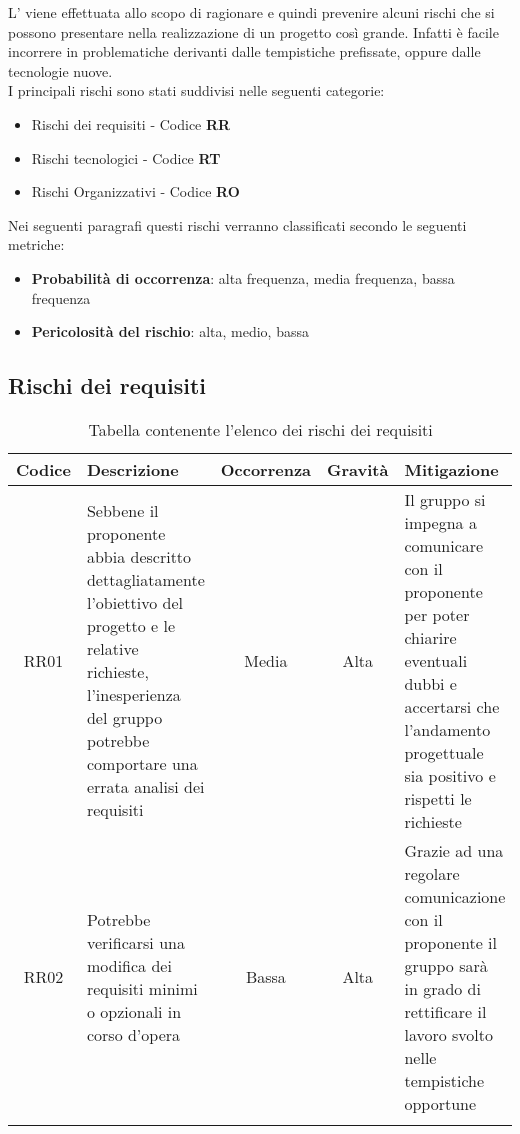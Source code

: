 \documentclass[../piano_di_progetto.tex]{subfiles}
\begin{document}
L’  viene effettuata allo scopo di ragionare e quindi prevenire alcuni rischi che si possono presentare nella realizzazione di un progetto così grande. Infatti è facile incorrere in problematiche derivanti dalle tempistiche prefissate, oppure dalle tecnologie nuove.\\
I principali rischi sono stati suddivisi nelle seguenti categorie:
\begin{itemize}
	\item Rischi dei requisiti - Codice \textbf{RR}
	\item Rischi tecnologici  - Codice \textbf{RT}
	\item Rischi Organizzativi - Codice \textbf{RO}
\end{itemize}
Nei seguenti paragrafi questi rischi verranno classificati secondo le seguenti metriche:
\begin{itemize}
	\item \textbf{Probabilità di occorrenza}: alta frequenza, media frequenza, bassa frequenza
	\item \textbf{Pericolosità del rischio}: alta, medio, bassa
\end{itemize}

\subsection{Rischi dei requisiti}%
\label{sub:rischi_req}

\begin{center}
	\begin{longtable}{|c|p{4.5cm}|c|c|p{4.5cm}|}
		\hline
		\rowcolor{lightgray}
		{\textbf{Codice}} & {\textbf{Descrizione}} & {\textbf{Occorrenza}} & {\textbf{Gravità}} & {\textbf{Mitigazione}}                                                     \\

		\hline
		RR01              &
		Sebbene il proponente abbia descritto dettagliatamente l’obiettivo del progetto e le relative richieste, l’inesperienza del gruppo potrebbe comportare una errata analisi dei requisiti
		                  &
		Media
		                  &
		Alta
		                  &
		Il gruppo si impegna a comunicare con il proponente per poter chiarire eventuali dubbi e accertarsi che l’andamento progettuale sia positivo e rispetti le richieste \\

		RR02              &
		Potrebbe verificarsi una modifica dei requisiti minimi o opzionali in corso d’opera
		                  &
		Bassa
		                  &
		Alta
		                  &
		Grazie ad una regolare comunicazione con il proponente il gruppo sarà in grado di rettificare il lavoro svolto nelle tempistiche opportune                           \\
		\hline
		\rowcolor{white}
		\caption{Tabella contenente l'elenco dei rischi dei requisiti}
	\end{longtable}

\end{center}
\end{document}
